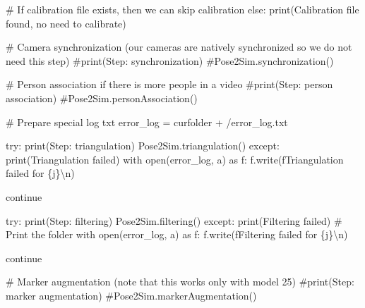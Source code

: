 \documentclass[
  letterpaper,
  DIV=11,
  numbers=noendperiod]{scrreprt}
\newenvironment{Shaded}{\begin{snugshade}}{\end{snugshade}}
\newcommand{\BuiltInTok}[1]{\textcolor[rgb]{0.00,0.23,0.31}{#1}}
\newcommand{\CharTok}[1]{\textcolor[rgb]{0.13,0.47,0.30}{#1}}
\newcommand{\CommentTok}[1]{\textcolor[rgb]{0.37,0.37,0.37}{#1}}
\newcommand{\ControlFlowTok}[1]{\textcolor[rgb]{0.00,0.23,0.31}{#1}}
\newcommand{\ImportTok}[1]{\textcolor[rgb]{0.00,0.46,0.62}{#1}}
\newcommand{\NormalTok}[1]{\textcolor[rgb]{0.00,0.23,0.31}{#1}}
\newcommand{\OperatorTok}[1]{\textcolor[rgb]{0.37,0.37,0.37}{#1}}
\newcommand{\SpecialCharTok}[1]{\textcolor[rgb]{0.37,0.37,0.37}{#1}}
\newcommand{\SpecialStringTok}[1]{\textcolor[rgb]{0.13,0.47,0.30}{#1}}
\newcommand{\StringTok}[1]{\textcolor[rgb]{0.13,0.47,0.30}{#1}}
\begin{document}
\begin{Shaded}
\begin{Highlighting}[]
    \CommentTok{\# If calibration file exists, then we can skip calibration}
    \ControlFlowTok{else}\NormalTok{:}
        \BuiltInTok{print}\NormalTok{(}\StringTok{\textquotesingle{}Calibration file found, no need to calibrate\textquotesingle{}}\NormalTok{)}
    
    \CommentTok{\# Camera synchronization (our cameras are natively synchronized so we do not need this step)}
    \CommentTok{\#print(\textquotesingle{}Step: synchronization\textquotesingle{})}
    \CommentTok{\#Pose2Sim.synchronization()}

    \CommentTok{\# Person association if there is more people in a video}
    \CommentTok{\#print(\textquotesingle{}Step: person association\textquotesingle{})}
    \CommentTok{\#Pose2Sim.personAssociation()}

    \CommentTok{\# Prepare special log txt}
\NormalTok{    error\_log }\OperatorTok{=}\NormalTok{ curfolder }\OperatorTok{+} \StringTok{\textquotesingle{}/error\_log.txt\textquotesingle{}}

    \ControlFlowTok{try}\NormalTok{:}
        \BuiltInTok{print}\NormalTok{(}\StringTok{\textquotesingle{}Step: triangulation\textquotesingle{}}\NormalTok{)}
\NormalTok{        Pose2Sim.triangulation()}
    \ControlFlowTok{except}\NormalTok{:}
        \BuiltInTok{print}\NormalTok{(}\StringTok{\textquotesingle{}Triangulation failed\textquotesingle{}}\NormalTok{)}
        \ControlFlowTok{with} \BuiltInTok{open}\NormalTok{(error\_log, }\StringTok{\textquotesingle{}a\textquotesingle{}}\NormalTok{) }\ImportTok{as}\NormalTok{ f:}
\NormalTok{            f.write(}\SpecialStringTok{f\textquotesingle{}Triangulation failed for }\SpecialCharTok{\{}\NormalTok{j}\SpecialCharTok{\}}\CharTok{\textbackslash{}n}\SpecialStringTok{\textquotesingle{}}\NormalTok{)}

        \ControlFlowTok{continue}

    \ControlFlowTok{try}\NormalTok{:}
        \BuiltInTok{print}\NormalTok{(}\StringTok{\textquotesingle{}Step: filtering\textquotesingle{}}\NormalTok{)}
\NormalTok{        Pose2Sim.filtering()}
    \ControlFlowTok{except}\NormalTok{:}
        \BuiltInTok{print}\NormalTok{(}\StringTok{\textquotesingle{}Filtering failed\textquotesingle{}}\NormalTok{)}
        \CommentTok{\# Print the folder}
        \ControlFlowTok{with} \BuiltInTok{open}\NormalTok{(error\_log, }\StringTok{\textquotesingle{}a\textquotesingle{}}\NormalTok{) }\ImportTok{as}\NormalTok{ f:}
\NormalTok{            f.write(}\SpecialStringTok{f\textquotesingle{}Filtering failed for }\SpecialCharTok{\{}\NormalTok{j}\SpecialCharTok{\}}\CharTok{\textbackslash{}n}\SpecialStringTok{\textquotesingle{}}\NormalTok{)}

        \ControlFlowTok{continue}

    \CommentTok{\# Marker augmentation (note that this works only with model 25)}
    \CommentTok{\#print(\textquotesingle{}Step: marker augmentation\textquotesingle{})}
    \CommentTok{\#Pose2Sim.markerAugmentation()}
\end{Highlighting}
\end{Shaded}
\end{document}
